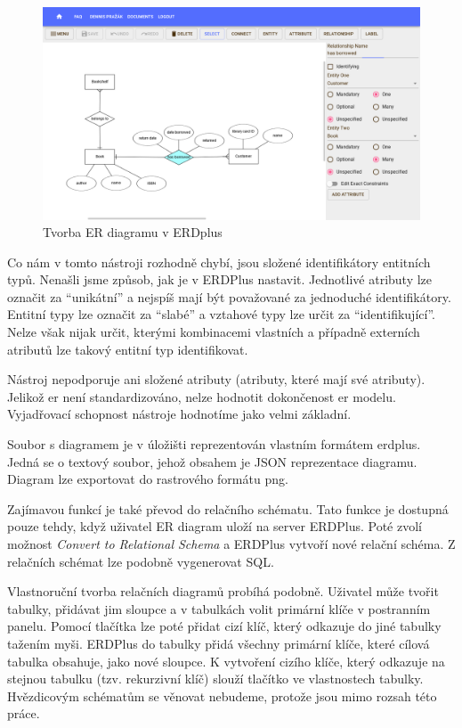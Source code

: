 \begin{figure}[!htb]
  \centering
  \includegraphics[width = \maxwidth{\textwidth}]{../img/erdplus.png}
  \caption{Tvorba ER diagramu v ERDplus}
  \label{fig:erdplus}
\end{figure}

Co nám v tomto nástroji rozhodně chybí, jsou složené identifikátory entitních typů.
Nenašli jsme způsob, jak je v ERDPlus nastavit.
Jednotlivé atributy lze označit za \enquote{unikátní} a nejspíš mají být považované za jednoduché identifikátory.
Entitní typy lze označit za \enquote{slabé} a vztahové typy lze určit za \enquote{identifikující}.
Nelze však nijak určit, kterými kombinacemi vlastních a případně externích atributů lze takový entitní typ identifikovat.

Nástroj nepodporuje ani složené atributy (atributy, které mají své atributy).
Jelikož \acrshort{er} není standardizováno, nelze hodnotit dokončenost \acrshort{er} modelu.
Vyjadřovací schopnost nástroje hodnotíme jako velmi základní.

Soubor s diagramem je v úložišti reprezentován vlastním formátem erdplus.
Jedná se o textový soubor, jehož obsahem je JSON reprezentace diagramu.
Diagram lze exportovat do rastrového formátu \acrshort{png}.

Zajímavou funkcí je také převod do relačního schématu.
Tato funkce je dostupná pouze tehdy, když uživatel ER diagram uloží na server ERDPlus.
Poté zvolí možnost \emph{Convert to Relational Schema} a ERDPlus vytvoří nové relační schéma.
Z relačních schémat lze podobně vygenerovat SQL.

Vlastnoruční tvorba relačních diagramů probíhá podobně.
Uživatel může tvořit tabulky, přidávat jim sloupce a v tabulkách volit primární klíče v postranním panelu.
Pomocí tlačítka  lze poté přidat cizí klíč, který odkazuje do jiné tabulky tažením myši.
ERDPlus do tabulky přidá všechny primární klíče, které cílová tabulka obsahuje, jako nové sloupce.
K vytvoření cizího klíče, který odkazuje na stejnou tabulku (tzv. rekurzivní klíč) slouží tlačítko  ve vlastnostech tabulky.
Hvězdicovým schématům se věnovat nebudeme, protože jsou mimo rozsah této práce.

